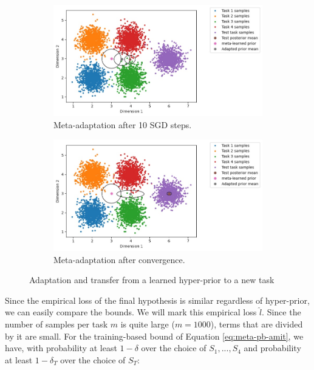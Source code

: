 \documentclass{article}
\theoremstyle{definition}
\begin{document}
\begin{figure}[h!]
	\centering
	\begin{subfigure}[b]{0.49\textwidth}
		\centering
		\includegraphics[width=\textwidth]{toy_example_aml_mid.JPG}
		\caption{Meta-adaptation after 10 SGD steps.}
	\end{subfigure}
	\hfill
	\begin{subfigure}[b]{0.49\textwidth}
		\centering
		\includegraphics[width=\textwidth]{toy_example_aml_fin.JPG}
		\caption{Meta-adaptation after convergence.}	 	
	\end{subfigure}
	\hfill
	\caption{Adaptation and transfer from a learned hyper-prior to a new task}	 
	\label{fig:ex-aml}
\end{figure}

Since the empirical loss of the final hypothesis is similar regardless of hyper-prior, we can easily compare the bounds. We will mark this empirical loss $\hat{l}$. Since the number of samples per task $m$ is quite large ($m=1000$), terms that are divided by it are small. For the training-based bound of Equation \ref{eq:meta-pb-amit}, we have, with probability at least $1-\delta$ over the choice of $S_1,...,S_4$ and probability at least $1-\delta_T$ over the choice of $S_T$:
\end{document}
